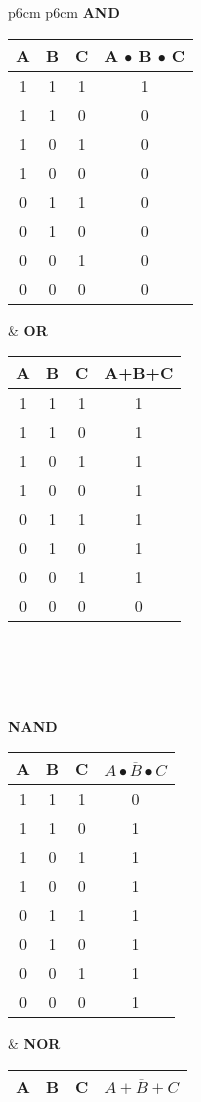 \documentclass[letterpaper,12pt,titlepage]{article}
\begin{document}
\begin{center}
\begin{tabular}{p{6cm} p{6cm}}
\textbf{AND~~}
 \begin{tabular}{c | c | c | c}
A 	& B 	& C 	& A $\bullet$ B $\bullet$ C\\ \hline
1 	& 1 	& 1 	&   1		\\
1 	& 1 	& 0 	&   0		\\
1 	& 0 	& 1 	&   0		\\
1 	& 0 	& 0 	&   0		\\
0 	& 1 	& 1 	&   0		\\
0 	& 1 	& 0 	&   0		\\
0 	& 0 	& 1 	&   0		\\
0 	& 0 	& 0 	&   0		\\
\end{tabular}
&
\textbf{OR~~}
 \begin{tabular}{c | c | c | c}
A 	& B 	& C 	& A+B+C\\ \hline
1 	& 1 	& 1 	&   1		\\
1 	& 1 	& 0 	&   1		\\
1 	& 0 	& 1 	&   1		\\
1 	& 0 	& 0 	&   1		\\
0 	& 1 	& 1 	&   1		\\
0 	& 1 	& 0 	&   1		\\
0 	& 0 	& 1 	&   1		\\
0 	& 0 	& 0 	&   0		\\
\end{tabular} 
\\\\\\\\
\textbf{NAND}
 \begin{tabular}{c | c | c | c}
A 	& B 	& C 	& $\overline{A \bullet B \bullet C}$\\ \hline
1 	& 1 	& 1 	&   0		\\
1 	& 1 	& 0 	&   1		\\
1 	& 0 	& 1 	&   1		\\
1 	& 0 	& 0 	&   1		\\
0 	& 1 	& 1 	&   1		\\
0 	& 1 	& 0 	&   1		\\
0 	& 0 	& 1 	&   1		\\
0 	& 0 	& 0 	&   1		\\
\end{tabular} 
&
\textbf{NOR}
 \begin{tabular}{c | c | c | c}
A 	& B 	& C 	& $\overline{A+B+C}$\\ \hline

\end{tabular}
\end{tabular}
\end{center}
\end{document}

